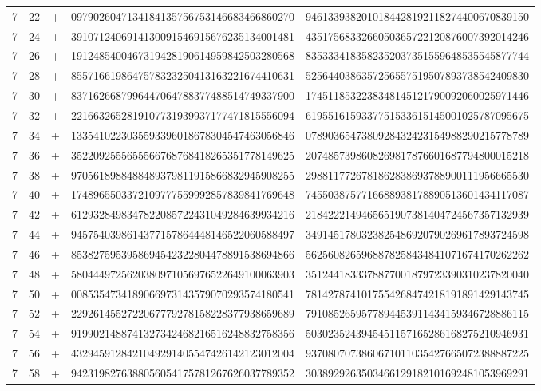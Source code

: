 \begin{longtable}{rrrll}
7 & 22 & + & 0979026047134184135756753146683466860270 & 9461339382010184428192118274400670839150 \\
7 & 24 & + & 3910712406914130091546915676235134001481 & 4351756833266050365722120876007392014246 \\
7 & 26 & + & 1912485400467319428190614959842503280568 & 8353334183582352037351559648535545877744 \\
7 & 28 & + & 8557166198647578323250413163221674410631 & 5256440386357256557519507893738542409830 \\
7 & 30 & + & 8371626687996447064788377488514749337900 & 1745118532238348145121790092060025971446 \\
7 & 32 & + & 2216632652819107731939937177471815556094 & 6195516159337751533615145001025787095675 \\
7 & 34 & + & 1335410223035593396018678304547463056846 & 0789036547380928432423154988290215778789 \\
7 & 36 & + & 3522092555655566768768418265351778149625 & 2074857398608269817876601687794800015218 \\
7 & 38 & + & 9705618988488489379811915866832945908255 & 2988117726781862838693788900111956665530 \\
7 & 40 & + & 1748965503372109777559992857839841769648 & 7455038757716688938178890513601434117087 \\
7 & 42 & + & 6129328498347822085722431049284639934216 & 2184222149465651907381404724567357132939 \\
7 & 44 & + & 9457540398614377157864448146522060588497 & 3491451780323825486920790269617893724598 \\
7 & 46 & + & 8538275953958694542322804478891538694866 & 5625608265968878258434841071674170262262 \\
7 & 48 & + & 5804449725620380971056976522649100063903 & 3512441833378877001879723390310237820040 \\
7 & 50 & + & 0085354734189066973143579070293574180541 & 7814278741017554268474218191891429143745 \\
7 & 52 & + & 2292614552722067779278158228377938659689 & 7910852659577894453911434159346728886115 \\
7 & 54 & + & 9199021488741327342468216516248832758356 & 5030235243945451157165286168275210946931 \\
7 & 56 & + & 4329459128421049291405547426142123012004 & 9370807073860671011035427665072388887225 \\
7 & 58 & + & 9423198276388056054175781267626037789352 & 3038929263503466129182101692481053969291 \\

\end{longtable}
